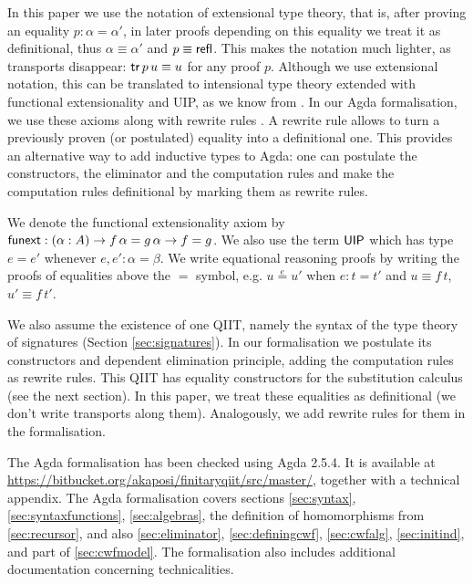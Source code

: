 \documentclass[acmsmall,screen]{acmart}
\begin{document}
In this paper we use the notation of extensional type theory, that is,
after proving an equality $p : \alpha=\alpha'$, in later proofs
depending on this equality we treat it as definitional, thus
$\alpha\equiv\alpha'$ and $p \equiv \mathsf{refl}$. This makes the notation
much lighter, as transports disappear: $\mathsf{tr}\,p\,u\equiv u$ for any
proof $p$. Although we use extensional notation, this can
be translated to intensional type theory extended with functional
extensionality and UIP, as we know from
\cite{hofmann95conservativity, Oury2005,theo}. In our Agda formalisation, we use these axioms
along with rewrite rules \cite{cockx}. A
rewrite rule allows to turn a previously proven (or postulated)
equality into a definitional one. %
This provides
an alternative way to add inductive types to Agda: one can postulate
the constructors, the eliminator and the computation rules and make
the computation rules definitional by marking them as rewrite rules.

We denote the functional extensionality axiom by $\mathsf{funext} : (\alpha :
A)\rightarrow f\,\alpha = g\,\alpha \rightarrow f = g$. We also use the term $\mathsf{UIP}$
which has type $e = e'$ whenever $e,e':\alpha=\beta$. We write
equational reasoning proofs by writing the proofs of equalities above
the $=$ symbol, e.g. $u \overset{e}{=} u'$ when $e:t = t'$ and
$u\equiv f\,t$, $u'\equiv f\,t'$.

We also assume the existence of one QIIT, namely the syntax of the
type theory of signatures (Section \ref{sec:signatures}). In our
formalisation we postulate its constructors and dependent elimination
principle, adding the computation rules as rewrite rules. This QIIT has
equality constructors for the substitution calculus (see the next
section). In this paper, we treat these equalities as definitional (we
don't write transports along them). Analogously, we add rewrite rules
for them in the formalisation.

The Agda formalisation has been checked using Agda 2.5.4. It is
available at
\url{https://bitbucket.org/akaposi/finitaryqiit/src/master/}, together
with a technical appendix. The Agda formalisation covers sections
\ref{sec:syntax}, \ref{sec:syntaxfunctions}, \ref{sec:algebras}, the
definition of homomorphisms from \ref{sec:recursor}, and also
\ref{sec:eliminator}, \ref{sec:definingcwf}, \ref{sec:cwfalg},
\ref{sec:initind}, and part of \ref{sec:cwfmodel}. The formalisation
also includes additional documentation concerning technicalities.
\end{document}
